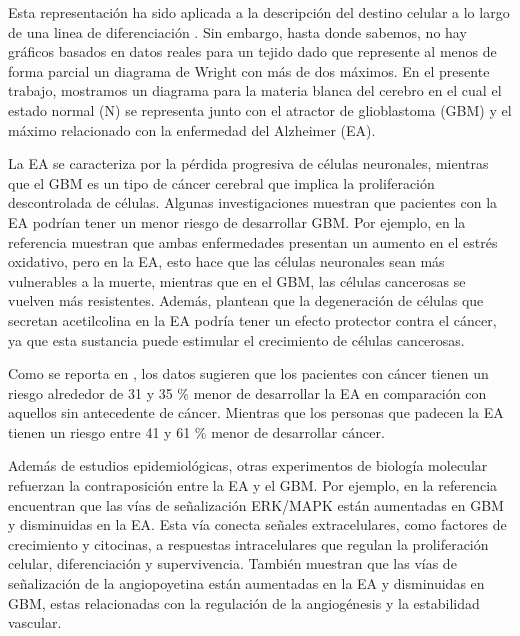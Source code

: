 Esta representación ha sido aplicada a la descripción del destino celular a lo largo de una linea de diferenciación \cite{casey2020theory}. Sin embargo, hasta donde sabemos, no hay gráficos basados en datos reales para un tejido dado que represente al menos de forma parcial un diagrama de Wright con más de dos máximos. En el presente trabajo, mostramos un diagrama para la materia blanca del cerebro en el cual el estado normal (N) se representa junto con el atractor de glioblastoma (GBM) y el máximo relacionado con la enfermedad del Alzheimer (EA).

La EA se caracteriza por la pérdida progresiva de células neuronales, mientras que el GBM es un tipo de cáncer cerebral que implica la proliferación descontrolada de células. Algunas investigaciones muestran que pacientes con la EA podrían tener un menor riesgo de desarrollar GBM. Por ejemplo, en la referencia \cite{ou2012does} muestran que ambas enfermedades presentan un aumento en el estrés oxidativo, pero en la EA, esto hace que las células neuronales sean más vulnerables a la muerte, mientras que en el GBM, las células cancerosas se vuelven más resistentes. Además, plantean que la degeneración de células que secretan acetilcolina en la EA podría tener un efecto protector contra el cáncer, ya que esta sustancia puede estimular el crecimiento de células cancerosas.


Como se reporta en  \cite{Roe_2010, Driver_2012, Musicco_2013}, los datos sugieren que los pacientes con cáncer tienen un riesgo alrededor de 31 y 35 \% menor de desarrollar la EA en comparación con aquellos sin antecedente de cáncer. Mientras que los personas que padecen la EA tienen un riesgo entre 41 y 61 \% menor de desarrollar cáncer.

Además de estudios epidemiológicas, otras experimentos de biología molecular refuerzan la contraposición entre la EA y el GBM. Por ejemplo, en la referencia \cite{Liu_2013} encuentran que las vías de señalización ERK/MAPK están aumentadas en GBM y disminuidas en la EA. Esta vía conecta señales extracelulares, como factores de crecimiento y citocinas, a respuestas intracelulares que regulan la proliferación celular, diferenciación y supervivencia. También muestran que las vías de señalización de la angiopoyetina están aumentadas en la EA y disminuidas en GBM, estas relacionadas con la regulación de la angiogénesis y la estabilidad vascular.

